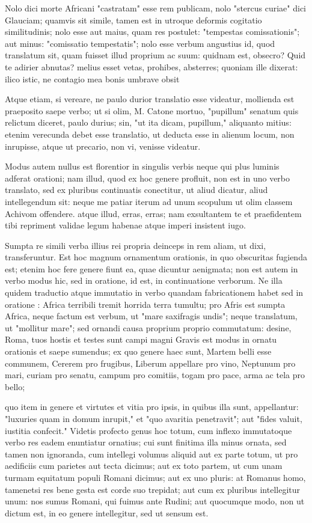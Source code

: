  Nolo dici morte Africani "castratam" esse rem publicam, nolo "stercus curiae" dici Glauciam; quamvis sit simile, tamen est in utroque deformis cogitatio similitudinis; nolo esse aut maius, quam res postulet: "tempestas comissationis"; aut minus: "comissatio tempestatis"; nolo esse verbum angustius id, quod translatum sit, quam fuisset illud proprium ac suum: quidnam est, obsecro? Quid te adirier abnutas? melius esset vetas, prohibes, absterres; quoniam ille dixerat: ilico istic, ne contagio mea bonis umbrave obsit

 Atque etiam, si vereare, ne paulo durior translatio esse videatur, mollienda est praeposito saepe verbo; ut si olim, M. Catone mortuo, "pupillum" senatum quis relictum diceret, paulo durius; sin, "ut ita dicam, pupillum," aliquanto mitius: etenim verecunda debet esse translatio, ut deducta esse in alienum locum, non inrupisse, atque ut precario, non vi, venisse videatur.

 Modus autem nullus est florentior in singulis verbis neque qui plus luminis adferat orationi; nam illud, quod ex hoc genere profluit, non est in uno verbo translato, sed ex pluribus continuatis conectitur, ut aliud dicatur, aliud intellegendum sit: neque me patiar iterum ad unum scopulum ut olim classem Achivom offendere. atque illud, erras, erras; nam exsultantem te et praefidentem tibi repriment validae legum habenae atque imperi insistent iugo.

 Sumpta re simili verba illius rei propria deinceps in rem aliam, ut dixi, transferuntur. Est hoc magnum ornamentum orationis, in quo obscuritas fugienda est; etenim hoc fere genere fiunt ea, quae dicuntur aenigmata; non est autem in verbo modus hic, sed in oratione, id est, in continuatione verborum. Ne illa quidem traductio atque immutatio in verbo quandam fabricationem habet sed in oratione : Africa terribili tremit horrida terra tumultu; pro Afris est sumpta Africa, neque factum est verbum, ut "mare saxifragis undis"; neque translatum, ut "mollitur mare"; sed ornandi causa proprium proprio commutatum: desine, Roma, tuos hostis et testes sunt campi magni Gravis est modus in ornatu orationis et saepe sumendus; ex quo genere haec sunt, Martem belli esse communem, Cererem pro frugibus, Liberum appellare pro vino, Neptunum pro mari, curiam pro senatu, campum pro comitiis, togam pro pace, arma ac tela pro bello;

 quo item in genere et virtutes et vitia pro ipsis, in quibus illa sunt, appellantur: "luxuries quam in domum inrupit," et "quo avaritia penetravit"; aut "fides valuit, iustitia confecit." Videtis profecto genus hoc totum, cum inflexo immutatoque verbo res eadem enuntiatur ornatius; cui sunt finitima illa minus ornata, sed tamen non ignoranda, cum intellegi volumus aliquid aut ex parte totum, ut pro aedificiis cum parietes aut tecta dicimus; aut ex toto partem, ut cum unam turmam equitatum populi Romani dicimus; aut ex uno pluris: at Romanus homo, tamenetsi res bene gesta est corde suo trepidat; aut cum ex pluribus intellegitur unum: nos sumus Romani, qui fuimus ante Rudini; aut quocumque modo, non ut dictum est, in eo genere intellegitur, sed ut sensum est.


